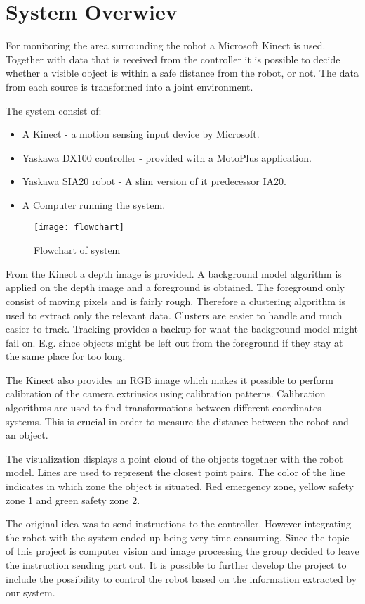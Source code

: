 
\section{System Overwiev}

For monitoring the area surrounding the robot a Microsoft Kinect is used. Together with data that is received from the controller it is possible to decide whether a visible object is within a safe distance from the robot, or not. The data from each source is transformed into a joint environment.

The system consist of:
\begin{itemize}
\item A Kinect - a motion sensing input device by Microsoft.
\item Yaskawa DX100 controller - provided with a MotoPlus application.
\item Yaskawa SIA20 robot - A slim version of it predecessor IA20.
\item A Computer running the system.
\end{itemize}

\begin{figure}[H]
\begin{center}
\texttt{[image: flowchart]}
\caption{Flowchart of system}
\label{flowchart}
\end{center}
\end{figure}




From the Kinect a depth image is provided. A background model algorithm is applied on the depth image and a foreground is obtained. The foreground only consist of moving pixels and is fairly rough. Therefore a clustering algorithm is used to extract only the relevant data. Clusters are easier to handle and much easier to track. Tracking provides a backup for what the background model might fail on. E.g. since objects might be left out from the foreground if they stay at the same place for too long.

The Kinect also provides an RGB image which makes it possible to perform calibration of the camera extrinsics using calibration patterns. Calibration algorithms are used to find transformations between different coordinates systems. This is crucial in order to measure the distance between the robot and an object.

The visualization displays a point cloud of the objects together with the robot model. Lines are used to represent the closest point pairs. The color of the line indicates in which zone the object is situated. Red emergency zone, yellow safety zone 1 and green safety zone 2.

The original idea was to send instructions to the controller. However integrating the robot with the system ended up being very time consuming. Since the topic of this project is computer vision and image processing the group decided to leave the instruction sending part out. It is possible to further develop the project to include the possibility to control the robot based on the information extracted by our system.


